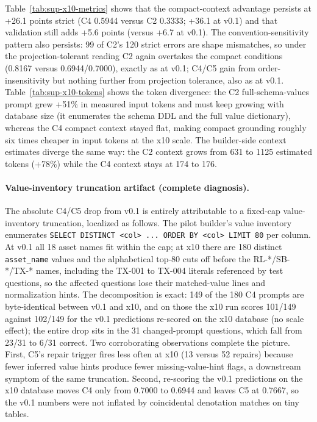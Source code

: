 \documentclass[11pt]{article}
\begin{document}
Table~\ref{tab:sup-x10-metrics} shows that the compact-context advantage persists at +26.1 points strict (C4 0.5944 versus C2 0.3333; +36.1 at v0.1) and that validation still adds +5.6 points (versus +6.7 at v0.1). The convention-sensitivity pattern also persists: 99 of C2's 120 strict errors are shape mismatches, so under the projection-tolerant reading C2 again overtakes the compact conditions (0.8167 versus 0.6944/0.7000), exactly as at v0.1; C4/C5 gain from order-insensitivity but nothing further from projection tolerance, also as at v0.1. Table~\ref{tab:sup-x10-tokens} shows the token divergence: the C2 full-schema-values prompt grew +51\% in measured input tokens and must keep growing with database size (it enumerates the schema DDL and the full value dictionary), whereas the C4 compact context stayed flat, making compact grounding roughly six times cheaper in input tokens at the x10 scale. The builder-side context estimates diverge the same way: the C2 context grows from 631 to 1125 estimated tokens (+78\%) while the C4 context stays at 174 to 176.

\paragraph{Value-inventory truncation artifact (complete diagnosis).} The absolute C4/C5 drop from v0.1 is entirely attributable to a fixed-cap value-inventory truncation, localized as follows. The pilot builder's value inventory enumerates \texttt{SELECT DISTINCT <col> ... ORDER BY <col> LIMIT 80} per column. At v0.1 all 18 asset names fit within the cap; at x10 there are 180 distinct \texttt{asset\_name} values and the alphabetical top-80 cuts off before the RL-*/SB-*/TX-* names, including the TX-001 to TX-004 literals referenced by test questions, so the affected questions lose their matched-value lines and normalization hints. The decomposition is exact: 149 of the 180 C4 prompts are byte-identical between v0.1 and x10, and on those the x10 run scores 101/149 against 102/149 for the v0.1 predictions re-scored on the x10 database (no scale effect); the entire drop sits in the 31 changed-prompt questions, which fall from 23/31 to 6/31 correct. Two corroborating observations complete the picture. First, C5's repair trigger fires less often at x10 (13 versus 52 repairs) because fewer inferred value hints produce fewer missing-value-hint flags, a downstream symptom of the same truncation. Second, re-scoring the v0.1 predictions on the x10 database moves C4 only from 0.7000 to 0.6944 and leaves C5 at 0.7667, so the v0.1 numbers were not inflated by coincidental denotation matches on tiny tables.
\end{document}
